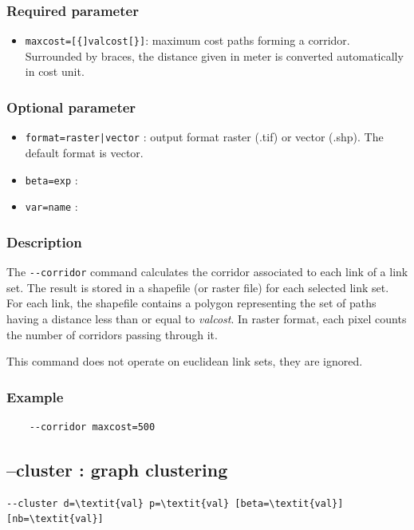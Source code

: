 \documentclass[a4paper,10pt]{report}
\begin{document}
\subsubsection{Required parameter}
\begin{itemize}
	\item \verb|maxcost=[{]valcost[}]|: maximum cost paths forming a corridor. Surrounded by braces, the distance given in meter is converted automatically in cost unit.
\end{itemize}

\subsubsection{Optional parameter}
\begin{itemize}
	\item \verb+format=raster|vector+ : output format raster (.tif) or vector (.shp). The default format is vector.
	\item \verb|beta=exp| : 
	\item \verb|var=name| : 	
\end{itemize}

\subsubsection{Description}
The \verb|--corridor| command calculates the corridor associated to each link of a link set.
The result is stored in a shapefile (or raster file) for each selected link set.
For each link, the shapefile contains a polygon representing the set of paths having a distance less than or equal to \textit{valcost}. In raster format, each pixel counts the number of corridors passing through it.

This command does not operate on euclidean link sets, they are ignored.

\subsubsection{Example}
\begin{Verbatim}
	--corridor maxcost=500
\end{Verbatim}

\subsection{--cluster : graph clustering}
\begin{Verbatim}[commandchars=\\\{\}]
--cluster d=\textit{val} p=\textit{val} [beta=\textit{val}] [nb=\textit{val}]
\end{Verbatim}
\end{document}
